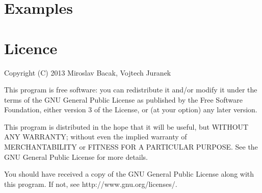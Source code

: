 \documentclass[a4paper,12pt]{amsart}
\begin{document}
\section{Examples}

\section{Licence}
Copyright (C) 2013 Miroslav Bacak, Vojtech Juranek

This program is free software: you can redistribute it and/or modify it under the terms of the GNU General Public License as published by the Free Software Foundation, either version 3 of the License, or (at your option) any later version.

This program is distributed in the hope that it will be useful, but WITHOUT ANY WARRANTY; without even the implied warranty of MERCHANTABILITY or FITNESS FOR A PARTICULAR PURPOSE.  See the GNU General Public License for more details.

You should have received a copy of the GNU General Public License along with this program.  If not, see http://www.gnu.org/licenses/.



\end{document}

